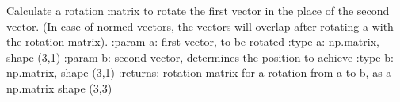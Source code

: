 \documentclass[letterpaper,10pt,english]{sphinxmanual}
\begin{document}

\begin{fulllineitems}
\label{\detokenize{pk_src.misc:pk_src.misc.getRotationAroundAxis}}
\end{fulllineitems}


\begin{fulllineitems}
\label{\detokenize{pk_src.misc:pk_src.misc.getRotationFromAToB}}
Calculate a rotation matrix to rotate the first vector in the place of the second vector. (In case of normed
vectors, the vectors will overlap after rotating a with the rotation matrix).
:param a: first vector, to be rotated
:type a: np.matrix, shape (3,1)
:param b: second vector, determines the position to achieve
:type b: np.matrix, shape (3,1)
:returns: rotation matrix for a rotation from a to b, as a np.matrix shape (3,3)

\end{fulllineitems}

\end{document}
